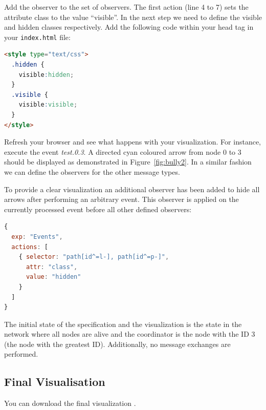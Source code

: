 Add the observer to the set of observers.
The first action (line 4 to 7) sets the attribute class to the value ``visible''.
In the next step we need to define the visible and hidden classes respectively.
Add the following code within your head tag in your \texttt{index.html} file:

\begin{lstlisting}[language=html]
<style type="text/css">
  .hidden {
    visible:hidden;
  }
  .visible {
    visible:visible;
  }
</style>
\end{lstlisting}

Refresh your browser and see what happens with your visualization.
For instance, execute the event \textit{test.0.3}.
A directed cyan coloured arrow from node 0 to 3 should be displayed as demonstrated in Figure~\ref{fig:bully2}.
In a similar fashion we can define the observers for the other message types. 

To provide a clear visualization an additional observer has been added to hide all arrows after performing an arbitrary event.
This observer is applied on the currently processed event before all other defined observers:

\begin{lstlisting}[language=JavaScript]
{
  exp: "Events",
  actions: [
    { selector: "path[id^=l-], path[id^=p-]", 
      attr: "class", 
      value: "hidden"
    }
  ]
}
\end{lstlisting}
 
The initial state of the specification and the visualization is the state in the network where all nodes are alive and the coordinator is the node with the ID 3 (the node with the greatest ID). 
Additionally, no message exchanges are performed.

\subsection{Final Visualisation}

You can download the final visualization .